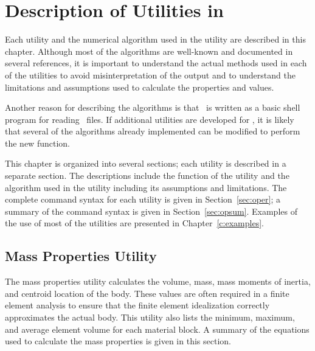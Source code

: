 \chapter{Description of Utilities in \numbers}
\label{c:numerics}

Each utility and the numerical algorithm used in the utility are
described in this chapter. Although most of the algorithms are
well-known and documented in several references, it is important to
understand the actual methods used in each of the utilities to avoid
misinterpretation of the output and to understand the limitations and
assumptions used to calculate the properties and values.

Another reason for describing the algorithms is that \numbers\ is
written as a basic shell program for reading \exo\ files.  If additional
utilities are developed for \numbers, it is likely that several of the
algorithms already implemented can be modified to perform the new
function.

This chapter is organized into several sections; each utility is
described in a separate section.  The descriptions include the function
of the utility and the algorithm used in the utility including its
assumptions and limitations.  The complete command syntax for each
utility is given in Section~\ref{sec:oper}; a summary of the command
syntax is given in Section~\ref{sec:opsum}.  Examples of the use of most
of the utilities are presented in Chapter~\ref{c:examples}.

\section{Mass Properties Utility}\label{sec:mass}

The mass properties utility calculates the volume, mass, mass moments of
inertia, and centroid location of the body.  These values are often
required in a finite element analysis to ensure that the finite element
idealization correctly approximates the actual body.  This utility also
lists the minimum, maximum, and average element volume for each material
block.  A summary of the equations used to calculate the mass properties
is given in this section.

